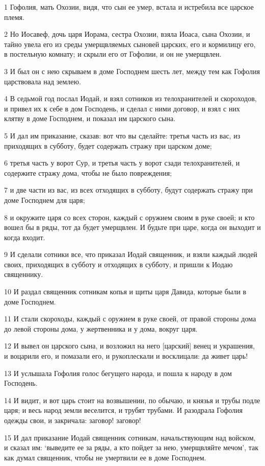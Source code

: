 \par 1 Гофолия, мать Охозии, видя, что сын ее умер, встала и истребила все царское племя.
\par 2 Но Иосавеф, дочь царя Иорама, сестра Охозии, взяла Иоаса, сына Охозии, и тайно увела его из среды умерщвляемых сыновей царских, его и кормилицу его, в постельную комнату; и скрыли его от Гофолии, и он не умерщвлен.
\par 3 И был он с нею скрываем в доме Господнем шесть лет, между тем как Гофолия царствовала над землею.
\par 4 В седьмой год послал Иодай, и взял сотников из телохранителей и скороходов, и привел их к себе в дом Господень, и сделал с ними договор, и взял с них клятву в доме Господнем, и показал им царского сына.
\par 5 И дал им приказание, сказав: вот что вы сделайте: третья часть из вас, из приходящих в субботу, будет содержать стражу при царском доме;
\par 6 третья часть у ворот Сур, и третья часть у ворот сзади телохранителей, и содержите стражу дома, чтобы не было повреждения;
\par 7 и две части из вас, из всех отходящих в субботу, будут содержать стражу при доме Господнем для царя;
\par 8 и окружите царя со всех сторон, каждый с оружием своим в руке своей; и кто вошел бы в ряды, тот да будет умерщвлен. И будьте при царе, когда он выходит и когда входит.
\par 9 И сделали сотники все, что приказал Иодай священник, и взяли каждый людей своих, приходящих в субботу и отходящих в субботу, и пришли к Иодаю священнику.
\par 10 И раздал священник сотникам копья и щиты царя Давида, которые были в доме Господнем.
\par 11 И стали скороходы, каждый с оружием в руке своей, от правой стороны дома до левой стороны дома, у жертвенника и у дома, вокруг царя.
\par 12 И вывел он царского сына, и возложил на него [царский] венец и украшения, и воцарили его, и помазали его, и рукоплескали и восклицали: да живет царь!
\par 13 И услышала Гофолия голос бегущего народа, и пошла к народу в дом Господень.
\par 14 И видит, и вот царь стоит на возвышении, по обычаю, и князья и трубы подле царя; и весь народ земли веселится, и трубят трубами. И разодрала Гофолия одежды свои, и закричала: заговор! заговор!
\par 15 И дал приказание Иодай священник сотникам, начальствующим над войском, и сказал им: `выведите ее за ряды, а кто пойдет за нею, умерщвляйте мечом', так как думал священник, чтобы не умертвили ее в доме Господнем.
